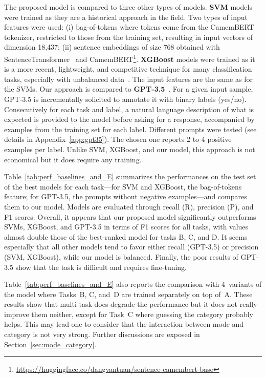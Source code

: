 The proposed model is compared to three other types of models.
%
\textbf{SVM} models were trained as they are a historical approach in the field.
Two types of input features were used: (i) bag-of-tokens where tokens come from the CamemBERT tokenizer, restricted to those from the training set, resulting in input vectors of dimension 18,437; (ii) sentence embeddings of size 768 obtained with SentenceTransformer~\cite{reimers2019sentence} and CamemBERT\footnote{\url{https://huggingface.co/dangvantuan/sentence-camembert-base}}.
% 
\textbf{XGBoost} models were trained as it is a more recent, lightweight, and competitive technique for many classification tasks, especially with unbalanced data~\cite{chen2016xgboost}. The input features are the same as for the SVMs.
% 
Our approach is compared to \textbf{GPT-3.5}~\cite{ouyang2022training}. For a given input sample, GPT-3.5 is incrementally solicited to annotate it with binary labels (yes/no). Consecutively for each task and label, a natural language description of what is expected is provided to the model before asking for a response, accompanied by examples from the training set for each label. Different prompts were tested (see details in Appendix~\ref{app:gpt35}). The chosen one reports 2 to 4 positive examples per label. Unlike SVM, XGBoost, and our model, this approach is not economical but it does require any training.

Table~\ref{tab:perf_baselines_and_E} summarizes the performances on the test set of the best models for each task---for SVM and XGBoost, the bag-of-tokens feature; for GPT-3.5, the prompts without negative examples---and compares them to our model.
%
Models are evaluated through recall (R), precision (P), and F1 scores.
%
Overall, it appears that our proposed model significantly outperforms SVMs, XGBoost, and GPT-3.5 in terms of F1 scores for all tasks, with values almost double those of the best-ranked model for tasks B, C, and D. It seems especially that all other models tend to favor either recall (GPT-3.5) or precision (SVM, XGBoost), while our model is balanced.
%
Finally, the poor results of GPT-3.5 show that the task is difficult and requires fine-tuning.

Table~\ref{tab:perf_baselines_and_E} also reports the comparison with 4~variants of the model where Tasks~B, C, and~D are trained separately on top of~A. These results show that multi-task does degrade the performance but it does not really improve them neither, except for Task~C where guessing the category probably helps. This may lead one to consider that the interaction between mode and category is not very strong. Further discussions are exposed in Section~\ref{sec:mode_category}.



